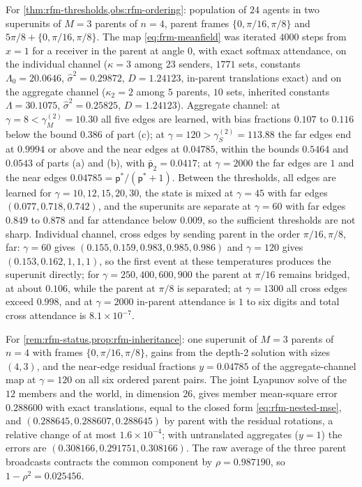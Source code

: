 \begin{numcheck}\label{chk:rfm-iteration}
For \cref{thm:rfm-thresholds,obs:rfm-ordering}: population of $24$ agents in two superunits of $M=3$ parents of $n=4$, parent frames $\{0,\pi/16,\pi/8\}$ and $5\pi/8+\{0,\pi/16,\pi/8\}$. The map \eqref{eq:frm-meanfield} was iterated $4000$ steps from $x=1$ for a receiver in the parent at angle $0$, with exact softmax attendance, on the individual channel ($\kappa=3$ among $23$ senders, $1771$ sets, constants $\Lambda_0=20.0646$, $\hat\sigma^2=0.29872$, $D=1.24123$, in-parent translations exact) and on the aggregate channel ($\kappa_2=2$ among $5$ parents, $10$ sets, inherited constants $\Lambda=30.1075$, $\hat\sigma^2=0.25825$, $D=1.24123$). Aggregate channel: at $\gamma=8<\gamma_M^{(2)}=10.30$ all five edges are learned, with bias fractions $0.107$ to $0.116$ below the bound $0.386$ of part (c); at $\gamma=120>\gamma_S^{(2)}=113.88$ the far edges end at $0.9994$ or above and the near edges at $0.04785$, within the bounds $0.5464$ and $0.0543$ of parts (a) and (b), with $\bar{\mathsf p}_2=0.0417$; at $\gamma=2000$ the far edges are $1$ and the near edges $0.04785=\mathsf p^\ast/(\mathsf p^\ast+1)$. Between the thresholds, all edges are learned for $\gamma=10,12,15,20,30$, the state is mixed at $\gamma=45$ with far edges $(0.077,0.718,0.742)$, and the superunits are separate at $\gamma=60$ with far edges $0.849$ to $0.878$ and far attendance below $0.009$, so the sufficient thresholds are not sharp. Individual channel, cross edges by sending parent in the order $\pi/16,\pi/8$, far: $\gamma=60$ gives $(0.155,0.159,0.983,0.985,0.986)$ and $\gamma=120$ gives $(0.153,0.162,1,1,1)$, so the first event at these temperatures produces the superunit directly; for $\gamma=250,400,600,900$ the parent at $\pi/16$ remains bridged, at about $0.106$, while the parent at $\pi/8$ is separated; at $\gamma=1300$ all cross edges exceed $0.998$, and at $\gamma=2000$ in-parent attendance is $1$ to six digits and total cross attendance is $8.1\times10^{-7}$.
\end{numcheck}

\begin{numcheck}\label{chk:rfm-residual}
For \cref{rem:rfm-status,prop:rfm-inheritance}: one superunit of $M=3$ parents of $n=4$ with frames $\{0,\pi/16,\pi/8\}$, gains from the depth-2 solution with sizes $(4,3)$, and the near-edge residual fractions $y=0.04785$ of the aggregate-channel map at $\gamma=120$ on all six ordered parent pairs. The joint Lyapunov solve of the $12$ members and the world, in dimension $26$, gives member mean-square error $0.288600$ with exact translations, equal to the closed form \eqref{eq:rfm-nested-mse}, and $(0.288645,0.288607,0.288645)$ by parent with the residual rotations, a relative change of at most $1.6\times10^{-4}$; with untranslated aggregates ($y=1$) the errors are $(0.308166,0.291751,0.308166)$. The raw average of the three parent broadcasts contracts the common component by $\rho=0.987190$, so $1-\rho^2=0.025456$.
\end{numcheck}


